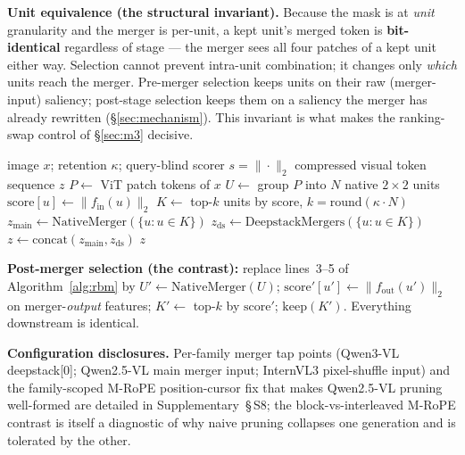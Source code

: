 \documentclass[sigconf,review,anonymous]{acmart}
\begin{document}
\textbf{Unit equivalence (the structural invariant).} Because the mask is at
\emph{unit} granularity and the merger is per-unit, a kept unit's merged token
is \textbf{bit-identical} regardless of stage --- the merger sees all four
patches of a kept unit either way. Selection cannot prevent intra-unit
combination; it changes only \emph{which} units reach the merger. Pre-merger
selection keeps units on their raw (merger-input) saliency; post-stage selection
keeps them on a saliency the merger has already rewritten (\S\ref{sec:mechanism}).
This invariant is what makes the ranking-swap control of \S\ref{sec:m3}
decisive.

\begin{algorithm}[t]
  \caption{Rank-Before-Merge (RBM), one image}
  \label{alg:rbm}
  \begin{algorithmic}[1]
    \REQUIRE image $x$; retention $\kappa$; query-blind scorer $s = \|\cdot\|_2$
    \ENSURE compressed visual token sequence $z$
    \STATE $P \gets$ ViT patch tokens of $x$ 
    \STATE $U \gets$ group $P$ into $N$ native $2\!\times\!2$ units 
      \STATE $\mathrm{score}[u] \gets \| f_{\mathrm{in}}(u) \|_2$ 
    \ENDFOR
    \STATE $K \gets$ top-$k$ units by score, $k = \mathrm{round}(\kappa \cdot N)$ 
    \STATE $z_{\mathrm{main}} \gets \mathrm{NativeMerger}(\{u : u \in K\})$ 
    \STATE $z_{\mathrm{ds}} \gets \mathrm{DeepstackMergers}(\{u : u \in K\})$ 
    \STATE $z \gets \mathrm{concat}(z_{\mathrm{main}}, z_{\mathrm{ds}})$
    \RETURN $z$ 
  \end{algorithmic}
\end{algorithm}

\noindent\textbf{Post-merger selection (the contrast):} replace lines~3--5 of
Algorithm~\ref{alg:rbm} by $U' \gets \mathrm{NativeMerger}(U)$;
$\mathrm{score}'[u'] \gets \| f_{\mathrm{out}}(u') \|_2$ on merger-\emph{output}
features; $K' \gets$ top-$k$ by $\mathrm{score}'$; $\mathrm{keep}(K')$.
Everything downstream is identical.

\textbf{Configuration disclosures.} Per-family merger tap points (Qwen3-VL
deepstack[0]; Qwen2.5-VL main merger input; InternVL3 pixel-shuffle input) and
the family-scoped M-RoPE position-cursor fix that makes Qwen2.5-VL pruning
well-formed are detailed in Supplementary~\S\,S8; the block-vs-interleaved M-RoPE
contrast is itself a diagnostic of why naive pruning collapses one generation and
is tolerated by the other.
\end{document}
